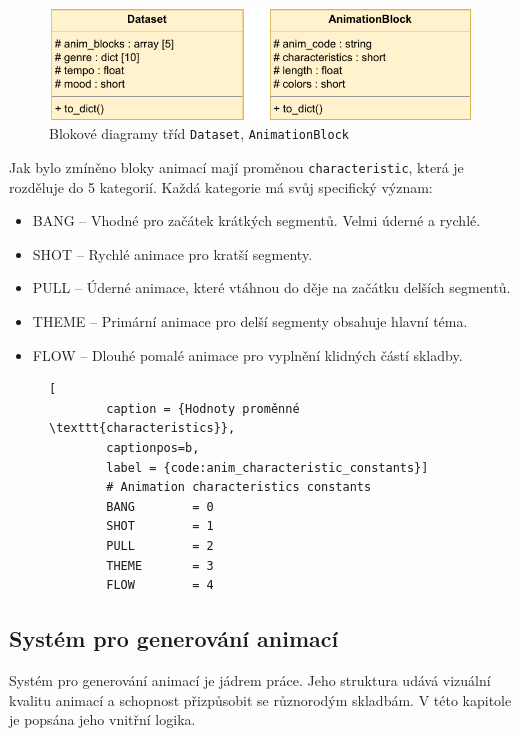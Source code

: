 \begin{figure}[H]
    \centering
    \includegraphics[width = 0.7\linewidth]{obrazky/UML_diagram_Dataset_and_AnimationBlock.pdf}
    \caption{Blokové diagramy tříd \texttt{Dataset}, \texttt{AnimationBlock}}
    \label{fig:UML_diagram_Dataset_AnimationBlock}
\end{figure}

Jak bylo zmíněno bloky animací mají proměnou \texttt{characteristic}, která je rozděluje do 5 kategorií. Každá kategorie má svůj specifický význam: 

\begin{itemize}
    \item BANG -- Vhodné pro začátek krátkých segmentů. Velmi úderné a rychlé.
    \item SHOT -- Rychlé animace pro kratší segmenty.
    \item PULL -- Úderné animace, které vtáhnou do děje na začátku delších segmentů.
    \item THEME -- Primární animace pro delší segmenty obsahuje hlavní téma.
    \item FLOW -- Dlouhé pomalé animace pro vyplnění klidných částí skladby.
\end{itemize}

\begin{figure}[H]
    \begin{lstlisting}[
        caption = {Hodnoty proměnné \texttt{characteristics}},
        captionpos=b,
        label = {code:anim_characteristic_constants}]
        # Animation characteristics constants
        BANG        = 0
        SHOT        = 1
        PULL        = 2
        THEME       = 3
        FLOW        = 4
    \end{lstlisting}
\end{figure}

\subsection{Systém pro generování animací} \label{sec:System_generovani_animaci}

Systém pro generování animací je jádrem práce. Jeho struktura udává vizuální kvalitu animací a schopnost přizpůsobit se různorodým skladbám. V této kapitole je popsána jeho vnitřní logika.

